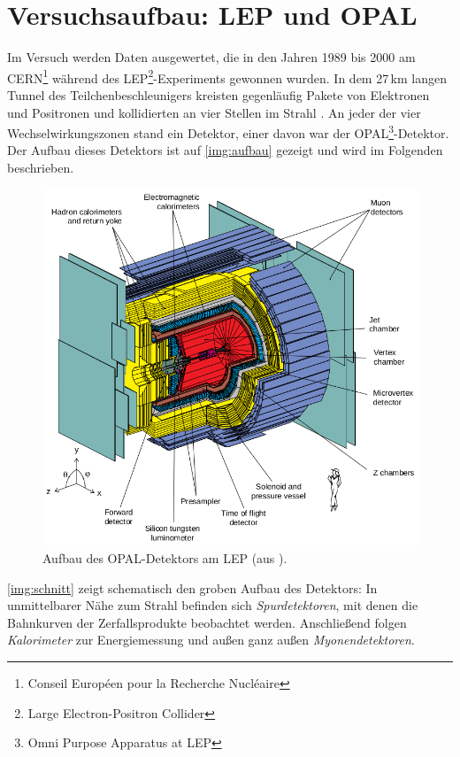 \section{Versuchsaufbau: LEP und OPAL}
Im Versuch werden Daten ausgewertet, die in den Jahren 1989 bis 2000 am
CERN\footnote{Conseil Européen pour la Recherche Nucléaire} während des
LEP\footnote{Large Electron-Positron Collider}-Experiments gewonnen wurden.
In dem 27\,km langen Tunnel des Teilchenbeschleunigers kreisten gegenläufig Pakete von Elektronen und Positronen
und kollidierten an vier Stellen im Strahl \cite{manual}.
An jeder der vier Wechselwirkungszonen stand ein Detektor, einer davon war der
OPAL\footnote{Omni Purpose Apparatus at LEP}-Detektor.
Der Aufbau dieses Detektors ist auf \autoref{img:aufbau} gezeigt und wird im Folgenden beschrieben.

\begin{figure}[H]
\begin{center}
  \includegraphics[width=\textwidth]{../img/aufbau.png}
  \caption{Aufbau des OPAL-Detektors am LEP (aus \cite{manualmuc}).}
  \label{img:aufbau}
\end{center}
\end{figure}

\autoref{img:schnitt} zeigt schematisch den groben Aufbau des Detektors:
In unmittelbarer Nähe zum Strahl befinden sich \emph{Spurdetektoren},
mit denen die Bahnkurven der Zerfallsprodukte beobachtet werden.
Anschließend folgen \emph{Kalorimeter} zur Energiemessung und außen ganz außen \emph{Myonendetektoren}.

